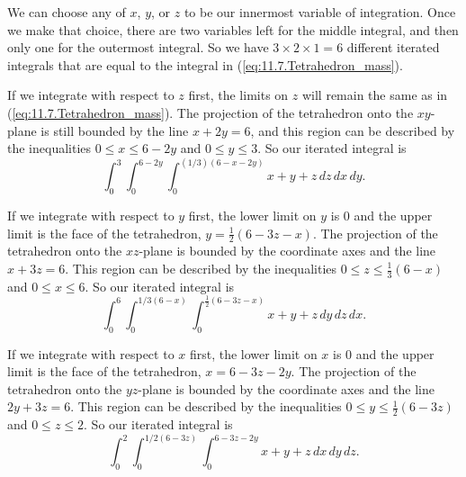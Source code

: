 \begin{activitySolution}
	\ba
	\item We can choose any of $x$, $y$, or $z$ to be our innermost variable of integration. Once we make that choice, there are two variables left for the middle integral, and then only one for the outermost integral. So we have $3 \times 2 \times 1 = 6$ different iterated integrals that are equal to the integral in (\ref{eq:11.7.Tetrahedron_mass}).

	\item If we integrate with respect to $z$ first, the limits on $z$ will remain the same as in (\ref{eq:11.7.Tetrahedron_mass}). The projection of the tetrahedron onto the $xy$-plane is still bounded by the line $x+2y=6$, and this region can be described by the inequalities $0 \leq x \leq 6-2y$ and $0 \leq y \leq 3$. So our iterated integral is  
\[\int_{0}^{3} \int_{0}^{6-2y} \int_{0}^{(1/3)(6-x-2y)} x+y+z \, dz \, dx \, dy.\]
		
	\item If we integrate with respect to $y$ first, the lower limit on $y$ is 0 and the upper limit is the face of the tetrahedron, $y = \frac{1}{2}(6-3z-x)$. The projection of the tetrahedron onto the $xz$-plane is bounded by the coordinate axes and the line $x+3z=6$. This region can be described by the inequalities $0 \leq z \leq \frac{1}{3}(6-x)$ and $0 \leq x \leq 6$. So our iterated integral is 
\[\int_{0}^{6} \int_{0}^{1/3(6-x)} \int_{0}^{\frac{1}{2}(6-3z-x)} x+y+z \, dy \, dz \, dx.\]


	\item If we integrate with respect to $x$ first, the lower limit on $x$ is 0 and the upper limit is the face of the tetrahedron, $x = 6-3z-2y$. The projection of the tetrahedron onto the $yz$-plane is bounded by the coordinate axes and the line $2y+3z=6$. This region can be described by the inequalities $0 \leq y \leq \frac{1}{2}(6-3z)$ and $0 \leq z \leq 2$. So our iterated integral is 
\[\int_{0}^{2} \int_{0}^{1/2(6-3z)} \int_{0}^{6-3z-2y} x+y+z \, dx \, dy \, dz.\]

	\ea
\end{activitySolution}
\aftera
